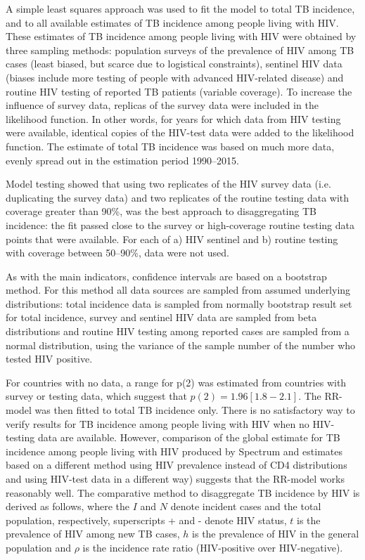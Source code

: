 A simple least squares approach was used to fit the model to total TB incidence, and to all available estimates of TB incidence among people living with HIV. These estimates of TB incidence among people living with HIV were obtained by three sampling methods: population surveys of the prevalence of HIV among TB cases (least biased, but scarce due to logistical constraints), sentinel HIV data (biases include more testing of people with advanced HIV-related disease) and routine HIV testing of reported TB patients (variable coverage). To increase the influence of survey data, replicas of the survey data were included in the likelihood function. In other words, for years for which data from HIV testing were available, identical copies of the HIV-test data were added to the likelihood function. The estimate of total TB incidence was based on much more data, evenly spread out in the estimation period 1990–2015.

Model testing showed that using two replicates of the HIV survey data (i.e. duplicating the survey data) and two replicates of the routine testing data with coverage greater than 90\%, was the best approach to disaggregating TB incidence: the fit passed close to the survey or high-coverage routine testing data points that were available. For each of a) HIV sentinel and b) routine testing with coverage between 50–90\%, data were not used.

As with the main indicators, confidence intervals are based on a bootstrap method. For this method all data sources are sampled from assumed underlying distributions: total incidence data is sampled from normally bootstrap result set for total incidence, survey and sentinel HIV data are sampled from beta distributions and routine HIV testing among reported cases are sampled from  a normal distribution, using the variance of the sample number of the number who tested HIV positive. 

For countries with no data, a range for p(2) was estimated from countries with survey or testing data, which suggest that $p(2) = 1.96 [1.8-2.1]$. The RR-model was then fitted to total TB incidence only. There is no satisfactory way to verify results for TB incidence among people living with HIV when no HIV-testing data are available. However, comparison of the global estimate for TB incidence among people living with HIV produced by Spectrum and estimates based on a different method using HIV prevalence instead of CD4 distributions and using  HIV-test data in a different way) suggests that the RR-model works reasonably well. The comparative method to disaggregate TB incidence by HIV is derived as follows, where the $I$ and $N$ denote incident cases and the total population, respectively, superscripts + and - denote HIV status, $t$ is the prevalence of HIV among new TB cases, $h$ is the prevalence of HIV in the general population and $\rho$ is the incidence rate ratio (HIV-positive over HIV-negative).

